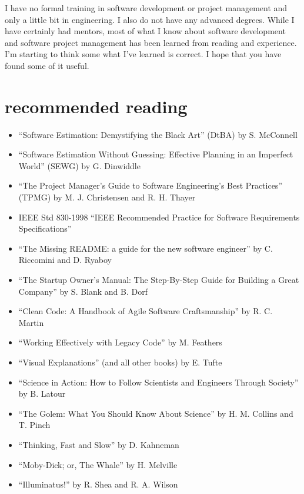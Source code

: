 \documentclass[12pt,oneside]{book}
\begin{document}
I have no formal training in software development or project management and only a little bit in engineering. I also do not have any advanced degrees. While I have certainly had mentors, most of what I know about software development and software project management has been learned from reading and experience. I'm starting to think some what I've learned is correct. I hope that you have found some of it useful.

\newpage
{}
\chapter*{recommended reading}
\label{scrivauto:55}

\label{scrivauto:56}
\begin{itemize}[wide, labelwidth=!, labelindent=0pt]
\item ``Software Estimation: Demystifying the Black Art'' (DtBA) by S. McConnell
\item ``Software Estimation Without Guessing: Effective Planning in an Imperfect World'' (SEWG) by G. Dinwiddle
\item ``The Project Manager's Guide to Software Engineering's Best Practices'' (TPMG) by M. J. Christensen and R. H. Thayer
\item IEEE Std 830-1998 ``IEEE Recommended Practice for Software Requirements Specifications''
\item ``The Missing README: a guide for the new software engineer'' by C. Riccomini and D. Ryaboy
\item ``The Startup Owner's Manual: The Step-By-Step Guide for Building a Great Company'' by S. Blank and B. Dorf
\item ``Clean Code: A Handbook of Agile Software Craftsmanship'' by R. C. Martin 
\item ``Working Effectively with Legacy Code'' by M. Feathers
\item ``Visual Explanations'' (and all other books) by E. Tufte
\item ``Science in Action: How to Follow Scientists and Engineers Through Society'' by B. Latour
\item ``The Golem: What You Should Know About Science'' by H. M. Collins and T. Pinch
\item ``Thinking, Fast and Slow'' by D. Kahneman
\item ``Moby-Dick; or, The Whale'' by H. Melville
\item ``Illuminatus!'' by R. Shea and R. A. Wilson
\end{itemize}
\end{document}

